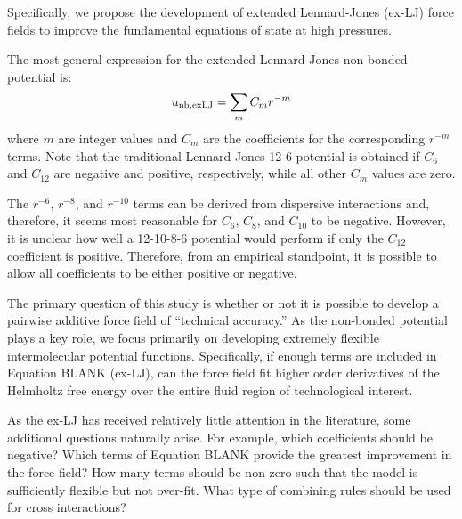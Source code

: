 \documentclass[11pt,a4paper]{article}
\begin{document}
Specifically, we propose the development of extended Lennard-Jones (ex-LJ) force fields to improve the fundamental equations of state at high pressures.

The most general expression for the extended Lennard-Jones non-bonded potential is:
\begin{equation} \label{ex-LJ general}
u_{\rm nb, exLJ} = \sum_m C_m r^{-m} 
\end{equation} 
where $m$ are integer values and $C_m$ are the coefficients for the corresponding $r^{-m}$ terms. Note that the traditional Lennard-Jones 12-6 potential is obtained if $C_6$ and $C_{12}$ are negative and positive, respectively, while all other $C_m$ values are zero. 

The $r^{-6}$, $r^{-8}$, and $r^{-10}$ terms can be derived from dispersive interactions and, therefore, it seems most reasonable for $C_6$, $C_8$, and $C_{10}$ to be negative. However, it is unclear how well a 12-10-8-6 potential would perform if only the $C_{12}$ coefficient is positive. Therefore, from an empirical standpoint, it is possible to allow all coefficients to be either positive or negative.


The primary question of this study is whether or not it is possible to develop a pairwise additive force field of ``technical accuracy.'' As the non-bonded potential plays a key role, we focus primarily on developing extremely flexible intermolecular potential functions. Specifically, if enough terms are included in Equation BLANK (ex-LJ), can the force field fit higher order derivatives of the Helmholtz free energy over the entire fluid region of technological interest.

As the ex-LJ has received relatively little attention in the literature, some additional questions naturally arise. For example, which coefficients should be negative? Which terms of Equation BLANK provide the greatest improvement in the force field? How many terms should be non-zero such that the model is sufficiently flexible but not over-fit. What type of combining rules should be used for cross interactions? 

\end{document}
